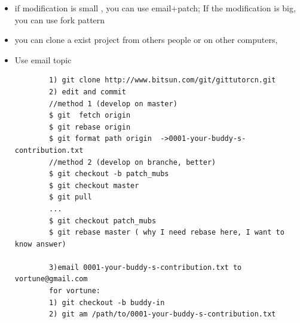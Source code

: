 \documentclass[a4paper,11pt,twoside]{book}
\begin{document}
%
%
%
%
	\begin{itemize}
	\item if modification is small , you can use email+patch; If the modification is big, you can use fork pattern

    \item you can clone a exist project from others people or on other computers,
	\item Use email topic
		\begin{verbatim}
		1) git clone http://www.bitsun.com/git/gittutorcn.git
		2) edit and commit
		//method 1 (develop on master)
		$ git  fetch origin
		$ git rebase origin
		$ git format path origin  ->0001-your-buddy-s-contribution.txt
		//method 2 (develop on branche, better)
		$ git checkout -b patch_mubs
		$ git checkout master
		$ git pull
		...
		$ git checkout patch_mubs
		$ git rebase master ( why I need rebase here, I want to know answer)
		
		3)email 0001-your-buddy-s-contribution.txt to vortune@gmail.com
		for vortune:
		1) git checkout -b buddy-in
		2) git am /path/to/0001-your-buddy-s-contribution.txt
		
		\end{verbatim}
	\end{itemize}
\end{document}
